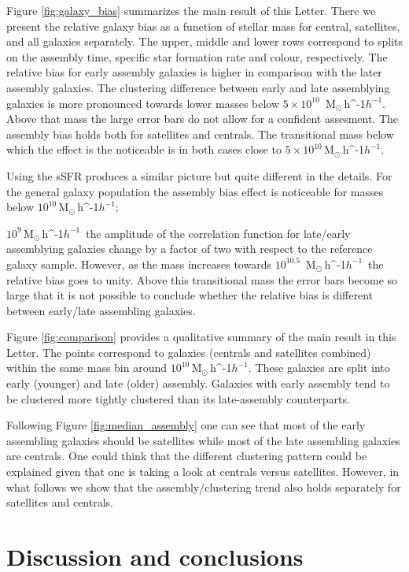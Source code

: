 \documentclass[fleqn,usenatbib]{mnras}
\newcommand{\Msunh}{\,{\rm M}$_{\odot}$\,\ifmmode h^{-1}\else $h^{-1}$\fi}
\begin{document}
Figure \ref{fig:galaxy_bias} summarizes the main result of this Letter.
There we present the relative galaxy bias as a
function of stellar mass for central, satellites, and all galaxies
separately. 
The upper, middle and lower rows correspond to splits on the assembly
time, specific star formation rate and colour, respectively.
The relative bias for early assembly galaxies is higher in comparison
with the later assembly galaxies.
The clustering difference between early and late assemblying galaxies
is more pronounced towards lower masses below $5 \times 10^{10}$
\Msunh.
Above that mass the large error bars do not allow for a confident
assesment. 
The assembly bias holds both for satellites and centrals.
The transitional mass below which the effect is the noticeable is in
both cases close to $5\times 10^{10}$\Msunh.

Using the sSFR produces a similar picture but quite different in the
details. 
For the general galaxy population the assembly bias effect is
noticeable for masses below $10^{10}$\Msunh;

$10^{9}$\Msunh\ the amplitude of the correlation function for
late/early assemblying galaxies change by a factor of two with respect
to the reference galaxy sample. 
However, as the mass increases towards $10^{10.5}$ \Msunh\ the relative
bias goes to unity.  
Above this transitional mass the error bars become so large that 
it is not possible to conclude whether the relative bias is different
between early/late assembling galaxies.  

Figure \ref{fig:comparison} provides a qualitative summary of the main
result in this Letter.
The points correspond to galaxies (centrals and satellites combined) 
within the same mass bin around $10^{10}$\Msunh. 
These galaxies are split into early (younger) and late (older)
assembly. 
Galaxies with early assembly tend to be clustered more tightly
clustered than its late-assembly counterparts.

Following Figure \ref{fig:median_assembly} one can see that most of the early
assembling galaxies should be satellites while most of the late
assembling galaxies are centrals. 
One could think that the different clustering pattern could be
explained given that one is taking a look at centrals versus
satellites. 
However, in what follows we show that the assembly/clustering trend also
holds separately for satellites and centrals.  



\section{Discussion and conclusions}
\label{sec:conclu}
\end{document}
